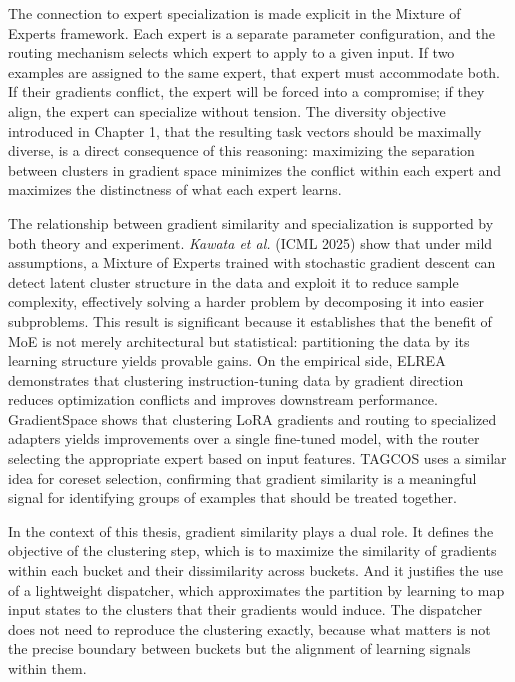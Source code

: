 The connection to expert specialization is made explicit in the Mixture of Experts framework. Each expert is a separate parameter configuration, and the routing mechanism selects which expert to apply to a given input. If two examples are assigned to the same expert, that expert must accommodate both. If their gradients conflict, the expert will be forced into a compromise; if they align, the expert can specialize without tension. The diversity objective introduced in Chapter 1, that the resulting task vectors should be maximally diverse, is a direct consequence of this reasoning: maximizing the separation between clusters in gradient space minimizes the conflict within each expert and maximizes the distinctness of what each expert learns.

The relationship between gradient similarity and specialization is supported by both theory and experiment. \emph{Kawata et al.} (ICML 2025) show that under mild assumptions, a Mixture of Experts trained with stochastic gradient descent can detect latent cluster structure in the data and exploit it to reduce sample complexity, effectively solving a harder problem by decomposing it into easier subproblems. This result is significant because it establishes that the benefit of MoE is not merely architectural but statistical: partitioning the data by its learning structure yields provable gains. On the empirical side, ELREA demonstrates that clustering instruction-tuning data by gradient direction reduces optimization conflicts and improves downstream performance. GradientSpace shows that clustering LoRA gradients and routing to specialized adapters yields improvements over a single fine-tuned model, with the router selecting the appropriate expert based on input features. TAGCOS uses a similar idea for coreset selection, confirming that gradient similarity is a meaningful signal for identifying groups of examples that should be treated together.



In the context of this thesis, gradient similarity plays a dual role. It defines the objective of the clustering step, which is to maximize the similarity of gradients within each bucket and their dissimilarity across buckets. And it justifies the use of a lightweight dispatcher, which approximates the partition by learning to map input states to the clusters that their gradients would induce. The dispatcher does not need to reproduce the clustering exactly, because what matters is not the precise boundary between buckets but the alignment of learning signals within them.


